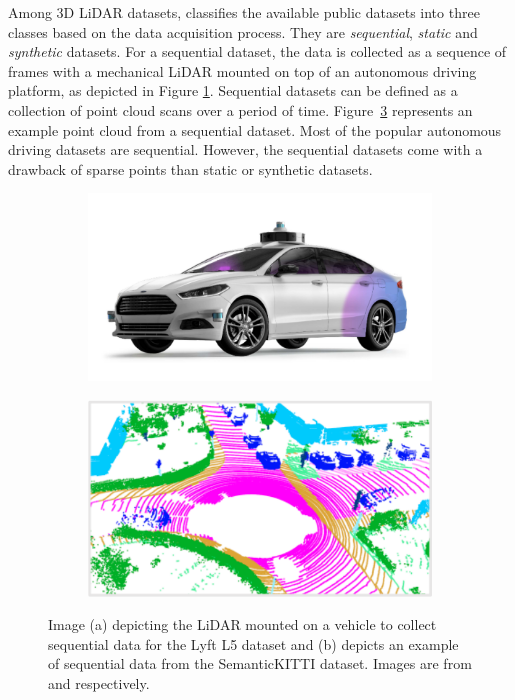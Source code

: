     Among 3D LiDAR datasets, \cite{survey3d} classifies the available public datasets into three classes based on the data acquisition process.
    They are \textit{sequential}, \textit{static} and \textit{synthetic} datasets.
    For a sequential dataset, the data is collected as a sequence of frames with a mechanical LiDAR mounted on top of an autonomous driving platform, as depicted in Figure \ref{fig:seq_data_lyft}.
    Sequential datasets can be defined as a collection of point cloud scans over a period of time.
    Figure~\ref{fig:example_sequential} represents an example point cloud from a sequential dataset.
    Most of the popular autonomous driving datasets are sequential. However, the sequential datasets come with a drawback of sparse points than static or synthetic datasets.
    \begin{figure}[h!]
        \begin{subfigure}{0.45\textwidth}
            \centering
            \includegraphics[scale=0.25]{images/sequential_lyft.png}
            \caption{}
            \label{fig:seq_data_lyft}
        \end{subfigure}
        \begin{subfigure}{0.45\textwidth}
            \centering
            \includegraphics[scale=0.45]{images/SemanticKitti.pdf}
            \caption{}
            \label{fig:example_sequential}
        \end{subfigure}
        \caption{Image (a) depicting the LiDAR mounted on a vehicle to collect sequential data for the Lyft L5 dataset and 
        (b) depicts an example of sequential data from the SemanticKITTI dataset. Images are from \cite{Lyftl5} and \cite{Hu_2020_CVPR_Randla} respectively.}
    \end{figure}
    
